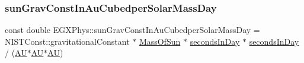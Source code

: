 \subsubsection{\texorpdfstring{sun\+Grav\+Const\+In\+Au\+Cubedper\+Solar\+Mass\+Day}{sunGravConstInAuCubedperSolarMassDay}}
{\footnotesize\ttfamily const double E\+G\+X\+Phys\+::sun\+Grav\+Const\+In\+Au\+Cubedper\+Solar\+Mass\+Day = N\+I\+S\+T\+Const\+::gravitational\+Constant $\ast$ \mbox{\hyperlink{namespace_e_g_x_phys_a6e84ae13f1dbcecb215af787bbc12cd6}{Mass\+Of\+Sun}} $\ast$ \mbox{\hyperlink{namespace_e_g_x_phys_ab4f86327f64403b843077ecc189ce52b}{seconds\+In\+Day}} $\ast$ \mbox{\hyperlink{namespace_e_g_x_phys_ab4f86327f64403b843077ecc189ce52b}{seconds\+In\+Day}} / (\mbox{\hyperlink{namespace_e_g_x_phys_a999332303a2214425184fbe23dbae0c5}{AU}}$\ast$\mbox{\hyperlink{namespace_e_g_x_phys_a999332303a2214425184fbe23dbae0c5}{AU}}$\ast$\mbox{\hyperlink{namespace_e_g_x_phys_a999332303a2214425184fbe23dbae0c5}{AU}})}

